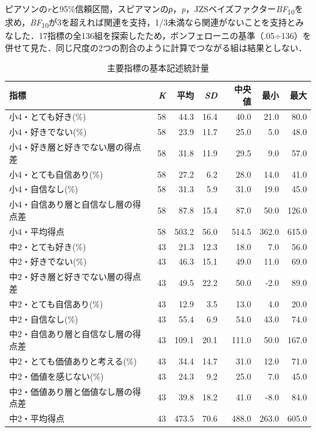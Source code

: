\documentclass[a4paper,10pt,twocolumn]{ltjsarticle}
\begin{document}
ピアソンの\textit{r}と95\%信頼区間，スピアマンの\textit{ρ}，\textit{p}，JZSベイズファクター\textit{BF}\textsubscript{10}を求め，\textit{BF}\textsubscript{10}が3を超えれば関連を支持，1/3未満なら関連がないことを支持とみなした．17指標の全136組を探索したため，ボンフェローニの基準（.05÷136）を併せて見た．同じ尺度の2つの割合のように計算でつながる組は結果としない．
\begin{table}[!t]
\caption{主要指標の基本記述統計量}
\centering\small
\begin{tabular}{>{\raggedright\arraybackslash}p{9.2cm}rrrrrr}
\toprule
指標 & \textit{K} & 平均 & \textit{SD} & 中央値 & 最小 & 最大 \\
\midrule
小4・とても好き(\%) & 58 & 44.3 & 16.4 & 40.0 & 21.0 & 80.0 \\
小4・好きでない(\%) & 58 & 23.9 & 11.7 & 25.0 & 5.0 & 48.0 \\
小4・好き層と好きでない層の得点差 & 58 & 31.8 & 11.9 & 29.5 & 9.0 & 57.0 \\
小4・とても自信あり(\%) & 58 & 27.2 & 6.2 & 28.0 & 14.0 & 41.0 \\
小4・自信なし(\%) & 58 & 31.3 & 5.9 & 31.0 & 19.0 & 45.0 \\
小4・自信あり層と自信なし層の得点差 & 58 & 87.8 & 15.4 & 87.0 & 50.0 & 126.0 \\
小4・平均得点 & 58 & 503.2 & 56.0 & 514.5 & 362.0 & 615.0 \\
中2・とても好き(\%) & 43 & 21.3 & 12.3 & 18.0 & 7.0 & 56.0 \\
中2・好きでない(\%) & 43 & 46.3 & 15.1 & 49.0 & 11.0 & 69.0 \\
中2・好き層と好きでない層の得点差 & 43 & 49.5 & 22.2 & 50.0 & -2.0 & 89.0 \\
中2・とても自信あり(\%) & 43 & 12.9 & 3.5 & 13.0 & 4.0 & 20.0 \\
中2・自信なし(\%) & 43 & 55.4 & 6.9 & 54.0 & 43.0 & 74.0 \\
中2・自信あり層と自信なし層の得点差 & 43 & 109.1 & 20.1 & 111.0 & 50.0 & 167.0 \\
中2・とても価値ありと考える(\%) & 43 & 34.4 & 14.7 & 31.0 & 12.0 & 71.0 \\
中2・価値を感じない(\%) & 43 & 24.3 & 9.2 & 25.0 & 7.0 & 45.0 \\
中2・価値あり層と価値なし層の得点差 & 43 & 39.8 & 18.2 & 41.0 & -8.0 & 84.0 \\
中2・平均得点 & 43 & 473.5 & 70.6 & 488.0 & 263.0 & 605.0 \\
\bottomrule
\end{tabular}
\par{}
\end{table}
\end{document}
